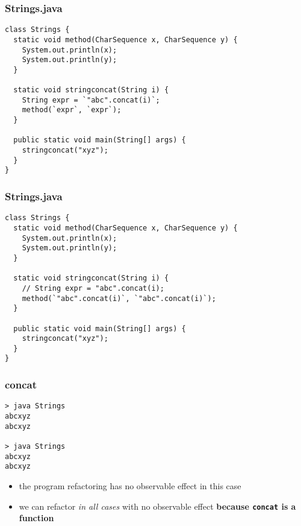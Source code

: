 \begin{frame}[fragile]
\frametitle{Strings.java}
\begin{lstlisting}
class Strings {
  static void method(CharSequence x, CharSequence y) {
    System.out.println(x);
    System.out.println(y);
  }

  static void stringconcat(String i) {
    String expr = `"abc".concat(i)`;
    method(`expr`, `expr`);
  }

  public static void main(String[] args) {
    stringconcat("xyz");
  }
}
\end{lstlisting}
\end{frame}

\begin{frame}[fragile]
\frametitle{Strings.java}
\begin{lstlisting}
class Strings {
  static void method(CharSequence x, CharSequence y) {
    System.out.println(x);
    System.out.println(y);
  }

  static void stringconcat(String i) {
    // String expr = "abc".concat(i);
    method(`"abc".concat(i)`, `"abc".concat(i)`);
  }

  public static void main(String[] args) {
    stringconcat("xyz");
  }
}
\end{lstlisting}
\end{frame}

\begin{frame}[fragile]
\frametitle{concat}
\begin{block}{}
\begin{lstlisting}
> java Strings
abcxyz
abcxyz

> java Strings
abcxyz
abcxyz
\end{lstlisting}
\end{block}
\begin{itemize}
  \item<1> the program refactoring has no observable effect in this case
  \item<2> we can refactor \emph{in all cases} with no observable effect \textbf{because \lstinline$concat$ is a function}
\end{itemize}
\end{frame}
